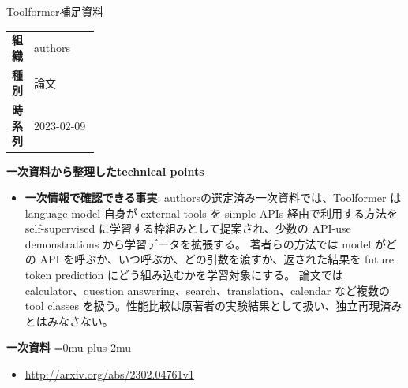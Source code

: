 \begin{technicalnote}{Toolformer}{補足資料}
\begingroup
\begin{tabularx}{\linewidth}{@{}>{\bfseries}p{0.22\linewidth}X@{}}
組織 & authors \\
種別 & 論文 \\
時系列 & 2023-02-09 \\
\end{tabularx}
\smallskip
{\bfseries 一次資料から整理したtechnical points}
\begin{itemize}[leftmargin=1.5em,itemsep=0.35em]
\item \textbf{一次情報で確認できる事実}: authorsの選定済み一次資料では、Toolformer は language model 自身が external tools を simple APIs 経由で利用する方法を self-supervised に学習する枠組みとして提案され、少数の API-use demonstrations から学習データを拡張する。 著者らの方法では model がどの API を呼ぶか、いつ呼ぶか、どの引数を渡すか、返された結果を future token prediction にどう組み込むかを学習対象にする。 論文では calculator、question answering、search、translation、calendar など複数の tool classes を扱う。性能比較は原著者の実験結果として扱い、独立再現済みとはみなさない。
\end{itemize}
\begin{minipage}{\linewidth}
\begin{samepage}
{\bfseries 一次資料}
\begingroup\sloppy
\Urlmuskip=0mu plus 2mu\relax
\begin{itemize}[leftmargin=1.5em,itemsep=0.25em]
\item {\scriptsize\url{http://arxiv.org/abs/2302.04761v1}}
\end{itemize}
\endgroup
\end{samepage}
\end{minipage}
\endgroup
\end{technicalnote}
\medskip
